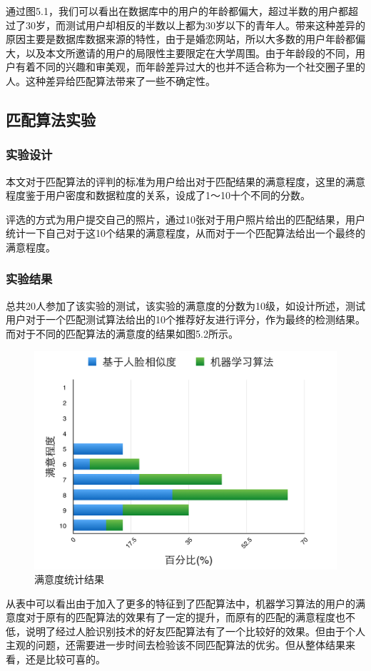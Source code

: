 通过图5.1，我们可以看出在数据库中的用户的年龄都偏大，超过半数的用户都超过了30岁，而测试用户却相反的半数以上都为30岁以下的青年人。带来这种差异的原因主要是数据库数据来源的特性，由于是婚恋网站，所以大多数的用户年龄都偏大，以及本文所邀请的用户的局限性主要限定在大学周围。由于年龄段的不同，用户有着不同的兴趣和审美观，而年龄差异过大的也并不适合称为一个社交圈子里的人。这种差异给匹配算法带来了一些不确定性。


\subsection{匹配算法实验}
\subsubsection{实验设计}
本文对于匹配算法的评判的标准为用户给出对于匹配结果的满意程度，这里的满意程度鉴于用户密度和数据粒度的关系，设成了1～10十个不同的分数。

评选的方式为用户提交自己的照片，通过10张对于用户照片给出的匹配结果，用户统计一下自己对于这10个结果的满意程度，从而对于一个匹配算法给出一个最终的满意程度。
\subsubsection{实验结果}
总共20人参加了该实验的测试，该实验的满意度的分数为10级，如设计所述，测试用户对于一个匹配测试算法给出的10个推荐好友进行评分，作为最终的检测结果。而对于不同的匹配算法的满意度的结果如图5.2所示。
\begin{figure}[h]
\begin{minipage}[t]{1\linewidth} 
\centering
\includegraphics[width=\textwidth]{img/chap5/exp2.png}
\caption{满意度统计结果\label{instagram}}
\end{minipage}
\end{figure}
从表中可以看出由于加入了更多的特征到了匹配算法中，机器学习算法的用户的满意度对于原有的匹配算法的效果有了一定的提升，而原有的匹配的满意程度也不低，说明了经过人脸识别技术的好友匹配算法有了一个比较好的效果。但由于个人主观的问题，还需要进一步时间去检验该不同匹配算法的优劣。但从整体结果来看，还是比较可喜的。
